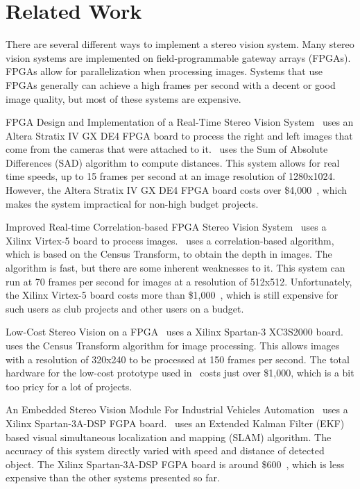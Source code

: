 \chapter{Related Work}

There are several different ways to implement a stereo vision system. Many stereo vision systems are implemented on field-programmable gateway arrays (FPGAs). FPGAs allow for parallelization when processing images. Systems that use FPGAs generally can achieve a high frames per second with a decent or good image quality, but most of these systems are expensive. 

FPGA Design and Implementation of a Real-Time Stereo Vision System~\cite{alteraStratixIVPaper} uses an Altera Stratix IV GX DE4 FPGA board to process the right and left images that come from the cameras that were attached to it.~\cite{alteraStratixIVPaper} uses the Sum of Absolute Differences (SAD) algorithm to compute distances. This system allows for real time speeds, up to 15 frames per second at an image resolution of 1280x1024. However, the Altera Stratix IV GX DE4 FPGA board costs over \$4,000~\cite{alteraStratixIVBoard}, which makes the system impractical for non-high budget projects.

Improved Real-time Correlation-based FPGA Stereo Vision System~\cite{xilinxVirtex5Paper} uses a Xilinx Virtex-5 board to process images.~\cite{xilinxVirtex5Paper} uses a correlation-based algorithm, which is based on the Census Transform, to obtain the depth in images. The algorithm is fast, but there are some inherent weaknesses to it. This system can run at 70 frames per second for images at a resolution of 512x512. Unfortunately, the Xilinx Virtex-5 board costs more than \$1,000~\cite{xilinxVirtex5Board}, which is still expensive for such users as club projects and other users on a budget.

Low-Cost Stereo Vision on a FPGA~\cite{lowCost1000} uses a Xilinx Spartan-3 XC3S2000 board.~\cite{lowCost1000} uses the Census Transform algorithm for image processing. This allows images with a resolution of 320x240 to be processed at 150 frames per second. The total hardware for the low-cost prototype used in~\cite{lowCost1000} costs just over \$1,000, which is a bit too pricy for a lot of projects.

An Embedded Stereo Vision Module For Industrial Vehicles Automation~\cite{xilinxSpartan3APaper} uses a Xilinx Spartan-3A-DSP FGPA board.~\cite{xilinxSpartan3APaper} uses an Extended Kalman Filter (EKF) based visual simultaneous localization and mapping (SLAM) algorithm. The accuracy of this system directly varied with speed and distance of detected object. The Xilinx Spartan-3A-DSP FGPA board is around \$600~\cite{xilinxSpartan3ABoard}, which is less expensive than the other systems presented so far.

